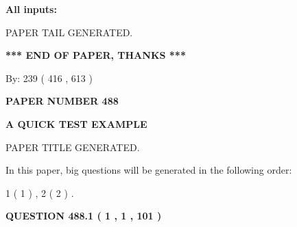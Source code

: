 \documentclass[12pt]{article}
\begin{document}
   
   
   
\noindent{}
   
   
   
   
\noindent\vspace{0.1in}\hspace{-0.08in} {\textbf{\Large{All inputs: }}}
   
   
   
   
   
   
 \vspace{0.2in}
 
   
   
\vspace{2.0in} PAPER TAIL GENERATED.
   
   
   
   
\vspace{1.0in} 
{\textbf{\large{ *** END OF PAPER, THANKS *** }}} 
   
   
\hspace{1.0in} By: 
 239 ( 416 ,  613 )
   
   
   
   
\newpage 
\setcounter{page}{ 
   488001 } 
   
   
   
   
 {\textbf{ \Large{ PAPER NUMBER  488  }}}
   
   
\vspace{0.2in}
   
   
   
   
   
   
   
   
 \vspace{0.2in}
{\LARGE {\textbf{ A QUICK TEST EXAMPLE}}}
   
   
 PAPER TITLE GENERATED.
   
   
   
\vspace{0.2in}
   
In this paper, big questions will be generated in the following order: 
   
   
   1 ( 1 )
 ,
   2 ( 2 )
 .
  
\vspace{0.2in}
  
{\textbf{\Large{QUESTION
488.1 
 ( 1 , 1 , 101 )
}}}
  
  
 
\end{document}
